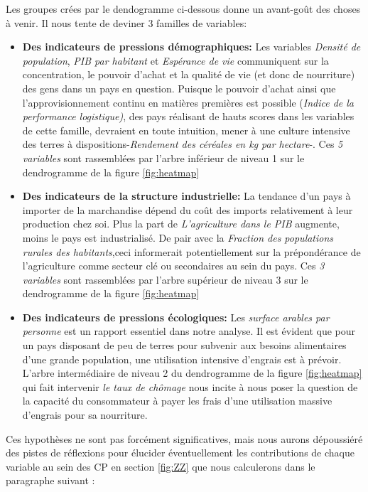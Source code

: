 				Les groupes crées par le dendogramme ci-dessous donne un avant-goût des choses à venir. Il nous tente de deviner 3 familles de variables:\begin{itemize}
				\item \textbf{Des indicateurs de pressions démographiques:} Les variables \textit{Densité de population}, \textit{PIB par habitant} et \textit{Espérance de vie} communiquent sur la concentration, le pouvoir d'achat et la qualité de vie (et donc de nourriture) des gens dans un pays en question. Puisque le pouvoir d'achat ainsi que l’approvisionnement continu en matières premières est possible (\textit{Indice de la performance logistique)}, des pays réalisant de hauts scores dans les variables de cette famille, devraient en toute intuition, mener à une culture intensive des terres à dispositions-\textit{Rendement des céréales en kg par hectare}-. Ces \textit{5 variables} sont rassemblées par l'arbre inférieur de niveau 1 sur le dendrogramme de la figure \ref{fig:heatmap}
				\item \textbf{Des indicateurs de la structure industrielle:} La tendance d'un pays à importer de la marchandise dépend du coût des imports relativement à leur production chez soi. Plus la part de \textit{L'agriculture dans le PIB} augmente, moins le pays est industrialisé. De pair avec la \textit{Fraction des populations rurales des habitants},ceci informerait potentiellement sur la prépondérance de l'agriculture comme secteur clé ou secondaires au sein du pays. Ces \textit{3 variables} sont rassemblées par l'arbre supérieur de niveau 3 sur le dendrogramme de la figure \ref{fig:heatmap}
				\item \textbf{Des indicateurs de pressions écologiques:} Les \textit{surface arables par personne} est un rapport essentiel dans notre analyse. Il est évident que pour un pays disposant de peu de terres pour subvenir aux besoins alimentaires d'une grande population, une utilisation intensive d'engrais est à prévoir. L'arbre intermédiaire de niveau 2 du dendrogramme de la figure \ref{fig:heatmap} qui fait intervenir \textit{le taux de chômage} nous incite à nous poser la question de la capacité du consommateur à payer les frais d'une utilisation massive d'engrais pour sa nourriture.
				\end{itemize}
	Ces hypothèses ne sont pas forcément significatives, mais nous aurons dépoussiéré des pistes de réflexions pour élucider éventuellement les contributions de chaque variable au sein des CP en section \ref{fig:ZZ} que nous calculerons dans le paragraphe suivant : 

